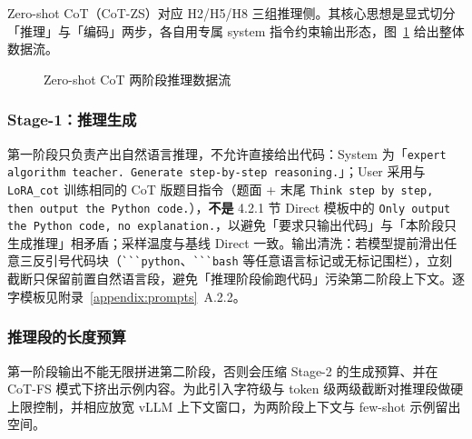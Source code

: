 
Zero-shot CoT（CoT-ZS）对应 H2/H5/H8 三组推理侧。其核心思想是显式切分「推理」与「编码」两步，各自用专属 system 指令约束输出形态，图~\ref{fig:ch4-cot-pipeline} 给出整体数据流。

\begin{figure}[!htb]
  \centering
  \caption{Zero-shot CoT 两阶段推理数据流}
  \label{fig:ch4-cot-pipeline}
\end{figure}

\subsubsection{Stage-1：推理生成}
第一阶段只负责产出自然语言推理，不允许直接给出代码：System 为「\texttt{expert algorithm teacher. Generate step-by-step reasoning.}」；User 采用与 \texttt{LoRA\_cot} 训练相同的 CoT 版题目指令（题面 + 末尾 \texttt{Think step by step, then output the Python code.}），\textbf{不是} 4.2.1 节 Direct 模板中的 \texttt{Only output the Python code, no explanation.}，以避免「要求只输出代码」与「本阶段只生成推理」相矛盾；采样温度与基线 Direct 一致。输出清洗：若模型提前滑出任意三反引号代码块（\verb|```python|、\verb|```bash| 等任意语言标记或无标记围栏），立刻截断只保留前置自然语言段，避免「推理阶段偷跑代码」污染第二阶段上下文。逐字模板见附录~\ref{appendix:prompts}~A.2.2。

\subsubsection{推理段的长度预算}
第一阶段输出不能无限拼进第二阶段，否则会压缩 Stage-2 的生成预算、并在 CoT-FS 模式下挤出示例内容。为此引入字符级与 token 级两级截断对推理段做硬上限控制，并相应放宽 vLLM 上下文窗口，为两阶段上下文与 few-shot 示例留出空间。

